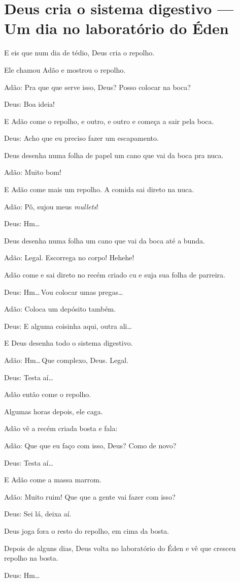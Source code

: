 \chapter[Deus cria o sistema digestivo]{Deus cria o sistema digestivo --- Um dia no laboratório do Éden}

E eis que num dia de tédio, Deus cria o repolho.

Ele chamou Adão e mostrou o repolho.

Adão: Pra que que serve isso, Deus? Posso colocar na boca?

Deus: Boa ideia!

E Adão come o repolho, e outro, e outro e começa a sair pela boca.

Deus: Acho que eu preciso fazer um escapamento.

Deus desenha numa folha de papel um cano que vai da boca pra nuca.

Adão: Muito bom!

E Adão come mais um repolho. A comida sai direto na nuca.

Adão: Pô, sujou meus \emph{mullets}!

Deus: Hm\ldots

Deus desenha numa folha um cano que vai da boca até a bunda.

Adão: Legal. Escorrega no corpo! Hehehe!

Adão come e sai direto no recém criado cu e suja sua folha de parreira.

Deus: Hm\ldots\,Vou colocar umas pregas\ldots

Adão: Coloca um depósito também.

Deus: E alguma coisinha aqui, outra ali\ldots

E Deus desenha todo o sistema digestivo.

Adão: Hm\ldots\,Que complexo, Deus. Legal.

Deus: Testa aí\ldots

Adão então come o repolho.

Algumas horas depois, ele caga.

Adão vê a recém criada bosta e fala:

Adão: Que que eu faço com isso, Deus? Como de novo?

Deus: Testa aí\ldots

E Adão come a massa marrom.

Adão: Muito ruim! Que que a gente vai fazer com isso? 

Deus: Sei lá, deixa aí.

Deus joga fora o resto do repolho, em cima da bosta.

\begin{sloppypar}
Depois de alguns dias, Deus volta no laboratório do Éden e vê que cresceu repolho na bosta.
\end{sloppypar}

Deus: Hm\ldots
